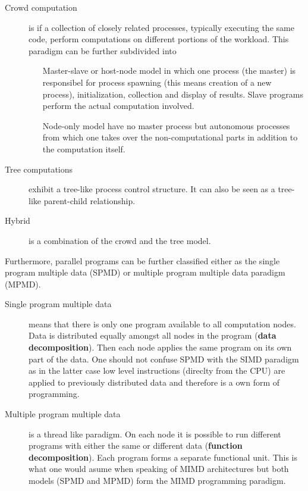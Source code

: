 \begin{description}
\item[Crowd computation] is if a collection of closely related
  processes, typically executing the same code, perform computations
  on different portions of the workload. This paradigm can be further
  subdivided into
  \begin{itemize}
  \item[Master-slave] or host-node model in which one process (the
    master) is responsibel for process spawning (this means creation
    of a new process), initialization, collection and display of
    results. Slave programs perform the actual computation involved.
  \item[Node-only] model have no master process but autonomous
    processes from which one takes over the non-computational parts
    in addition to the computation itself.
  \end{itemize}
\item[Tree computations] exhibit a tree-like process control
  structure. It can also be seen as a tree-like parent-child
  relationship.
\item[Hybrid] is a combination of the crowd and the tree model.
\end{description}

Furthermore, parallel programs can be further classified either as the
single program multiple data (SPMD) or multiple program multiple data
paradigm (MPMD). 

\begin{description}
\item[Single program multiple data] means that there is only one
  program available to all computation nodes. Data is distributed
  equally amongst all nodes in the program (\textbf{data
    decomposition}). Then each node applies the
  same program on its own part of the data. One should not confuse
  SPMD with the SIMD paradigm as in the latter case low level
  instructions (direclty from the CPU) are applied to previously
  distributed data and therefore is a own form of programming.
\item[Multiple program multiple data] is a thread like
  paradigm. On each node it is possible to run different programs with
  either the same or different data (\textbf{function
    decomposition}). Each program forms a separate
  functional unit. This is what one would asume when speaking of MIMD
  architectures but both models (SPMD and MPMD) form the MIMD
  programming paradigm. 
\end{description}

